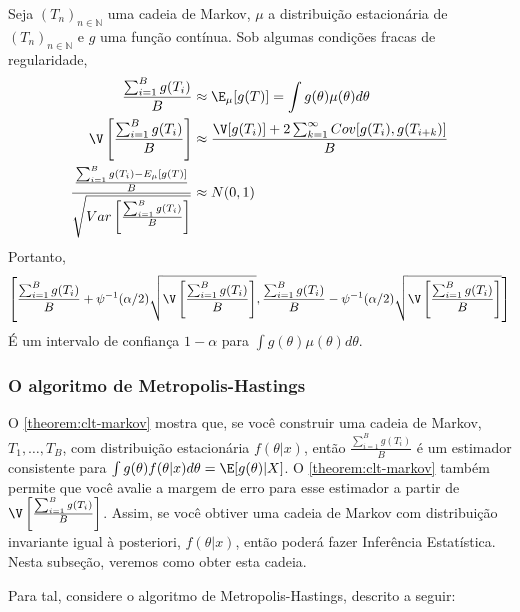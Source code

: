\begin{theorem}
 \label{theorem:clt-markov}
 Seja $(T_{n})_{n \in \mathbb{N}}$ uma 
 cadeia de Markov,
 $\mu$ a distribuição estacionária de
 $(T_{n})_{n \in \mathbb{N}}$ e 
 $g$ uma função contínua.
 Sob algumas condições fracas de regularidade,
 \begin{align*}
  \frac{\sum_{i=1}^{B}{g(T_{i})}}{B}
  &\approx \E_{\mu}[g(T)]
  = \int{g(\theta)\mu(\theta)d\theta} \\
  \V\left[\frac{\sum_{i=1}^{B}{g(T_{i})}}{B}\right] 
  &\approx \frac{\V[g(T_{i})]+2\sum_{k=1}^{\infty}{Cov[g(T_{i}),g(T_{i+k})]}}{B} \\
  \frac{\frac{\sum_{i=1}^{B}{g(T_{i})-E_{\mu}[g(T)]}}{B}}{\sqrt{Var\left[\frac{\sum_{i=1}^{B}{g(T_{i})}}{B}\right]}} &\approx N(0,1)
 \end{align*}
 Portanto,
 \begin{align*}
  \left[\frac{\sum_{i=1}^{B}{g(T_{i})}}{B}+\psi^{-1}(\alpha/2)\sqrt{\V\left[\frac{\sum_{i=1}^{B}{g(T_{i})}}{B}\right]},\frac{\sum_{i=1}^{B}{g(T_{i})}}{B}-\psi^{-1}(\alpha/2)\sqrt{\V\left[\frac{\sum_{i=1}^{B}{g(T_{i})}}{B}\right]}\right]
 \end{align*}
 É um intervalo de confiança $1-\alpha$ para
 $\int{g(\theta)\mu(\theta)d\theta}$.
\end{theorem}

\subsubsection{O algoritmo de Metropolis-Hastings}
\label{subsec:mh}

O \cref{theorem:clt-markov} mostra que,
se você construir uma cadeia de Markov, $T_{1},\ldots,T_{B}$,
com distribuição estacionária $f(\theta|x)$,
então $\frac{\sum_{i=1}^{B}{g(T_{i})}}{B}$ é um
estimador consistente para
$\int{g(\theta)f(\theta|x)d\theta} = \E[g(\theta)|X]$.
O \cref{theorem:clt-markov} também permite que 
você avalie a margem de erro para
esse estimador a partir
de $\V\left[\frac{\sum_{i=1}^{B}{g(T_{i})}}{B}\right]$.
Assim, se você obtiver uma cadeia de Markov com 
distribuição invariante igual à posteriori,
$f(\theta|x)$, então
poderá fazer Inferência Estatística.
Nesta subseção, veremos como obter esta cadeia.

Para tal, considere o algoritmo de
Metropolis-Hastings, descrito a seguir:

